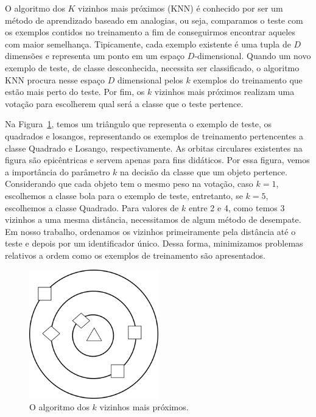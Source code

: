 O algoritmo dos $K$ vizinhos mais próximos (\textsc{KNN}) é conhecido por ser um método de aprendizado baseado em analogias, ou seja, comparamos o teste com os exemplos contidos no treinamento a fim de conseguirmos encontrar aqueles com maior semelhança. 
Tipicamente, cada exemplo existente é uma tupla de $D$ dimensões e representa um ponto em um espaço $D$-dimensional. 
Quando um novo exemplo de teste, de classe desconhecida, necessita ser classificado, o algoritmo \textsc{KNN} procura nesse espaço $D$ dimensional pelos $k$ exemplos do treinamento que estão mais perto do teste. 
Por fim, os $k$ vizinhos mais próximos realizam uma votação para escolherem qual será a classe que o teste pertence.

Na Figura~\ref{fig::knn}, temos um triângulo que representa o exemplo de teste, os quadrados e losangos, representando os exemplos de treinamento pertencentes a classe Quadrado e Losango, respectivamente. As orbitas circulares existentes na figura são epicêntricas e servem apenas para fins didáticos.
Por essa figura, vemos a importância do parâmetro $k$ na decisão da classe que um objeto pertence. Considerando que cada objeto tem o mesmo peso na votação, caso $k=1$, escolhemos a classe bola para o exemplo de teste, entretanto, se $k=5$, escolhemos a classe Quadrado. Para valores de $k$ entre 2 e 4, como temos 3 vizinhos a uma mesma distância, necessitamos de algum método de desempate. Em nosso trabalho, ordenamos os vizinhos primeiramente pela distância até o teste e depois por um identificador único. Dessa forma, minimizamos problemas relativos a ordem como os exemplos de treinamento são apresentados.

\begin{figure}[ht!]
\centering
\includegraphics[width=0.5\textwidth]{figures/knn.png}
\caption{O algoritmo dos $k$ vizinhos mais próximos.}
\label{fig::knn}
\end{figure}

